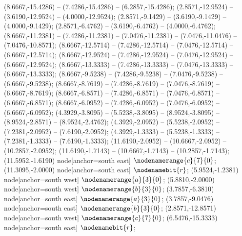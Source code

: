    (8.6667,-15.4286) -- (7.4286,-15.4286) -- (6.2857,-15.4286);
   (2.8571,-12.9524) -- (3.6190,-12.9524) -- (4.0000,-12.9524);
   (2.8571,-9.1429) -- (3.6190,-9.1429) -- (4.0000,-9.1429);
   (2.8571,-6.4762) -- (3.6190,-6.4762) -- (4.0000,-6.4762);
   (8.6667,-11.2381) -- (7.4286,-11.2381) -- (7.0476,-11.2381) -- (7.0476,-11.0476) -- (7.0476,-10.8571);
   (8.6667,-12.5714) -- (7.4286,-12.5714) -- (7.0476,-12.5714) -- (6.6667,-12.5714);
   (8.6667,-12.9524) -- (7.4286,-12.9524) -- (7.0476,-12.9524) -- (6.6667,-12.9524);
   (8.6667,-13.3333) -- (7.4286,-13.3333) -- (7.0476,-13.3333) -- (6.6667,-13.3333);
   (8.6667,-9.5238) -- (7.4286,-9.5238) -- (7.0476,-9.5238) -- (6.6667,-9.5238);
   (8.6667,-8.7619) -- (7.4286,-8.7619) -- (7.0476,-8.7619) -- (6.6667,-8.7619);
   (8.6667,-6.8571) -- (7.4286,-6.8571) -- (7.0476,-6.8571) -- (6.6667,-6.8571);
   (8.6667,-6.0952) -- (7.4286,-6.0952) -- (7.0476,-6.0952) -- (6.6667,-6.0952);
   (4.3929,-3.8095) -- (5.5238,-3.8095) -- (8.9524,-3.8095) -- (8.9524,-2.8571) -- (8.9524,-2.4762);
   (4.3929,-2.0952) -- (5.5238,-2.0952) -- (7.2381,-2.0952) -- (7.6190,-2.0952);
   (4.3929,-1.3333) -- (5.5238,-1.3333) -- (7.2381,-1.3333) -- (7.6190,-1.3333);
   (11.6190,-2.0952) -- (10.6667,-2.0952) -- (10.2857,-2.0952);
   (11.6190,-1.7143) -- (10.6667,-1.7143) -- (10.2857,-1.7143);
   (11.5952,-1.6190) node[anchor=south east] {$\nodenamerange{c}{7}{0}$};
   (11.3095,-2.0000) node[anchor=south east] {$\nodenamebit{r}$};
   (5.9524,-1.2381) node[anchor=south west] {$\nodenamerange{a}{3}{0}$};
   (5.8810,-2.0000) node[anchor=south west] {$\nodenamerange{b}{3}{0}$};
   (3.7857,-6.3810) node[anchor=south east] {$\nodenamerange{a}{3}{0}$};
   (3.7857,-9.0476) node[anchor=south east] {$\nodenamerange{b}{3}{0}$};
   (2.8571,-12.8571) node[anchor=south west] {$\nodenamerange{c}{7}{0}$};
   (6.5476,-15.3333) node[anchor=south east] {$\nodenamebit{r}$};
